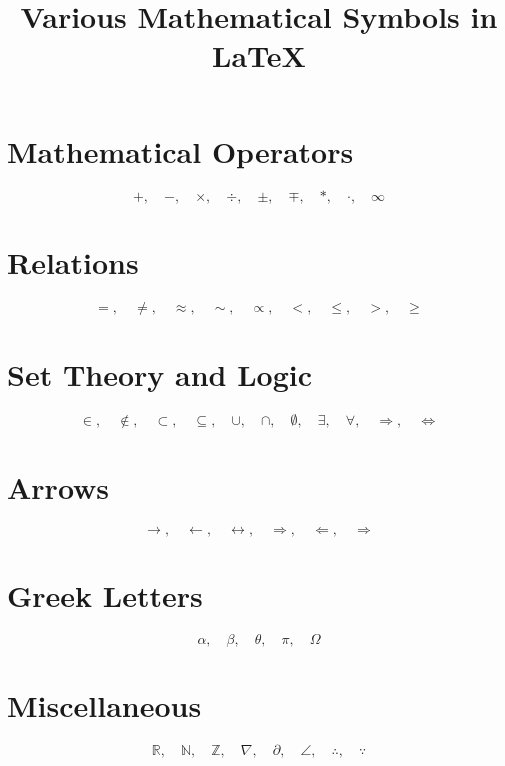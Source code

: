 \documentclass{article}
\title{Various Mathematical Symbols in LaTeX}
\begin{document}
\maketitle

\section*{Mathematical Operators}
\[
+, \quad -, \quad \times, \quad \div, \quad \pm, \quad \mp, \quad \ast, \quad \cdot, \quad \infty
\]

\section*{Relations}
\[
=, \quad \neq, \quad \approx, \quad \sim, \quad \propto, \quad <, \quad \leq, \quad >, \quad \geq
\]

\section*{Set Theory and Logic}
\[
\in, \quad \notin, \quad \subset, \quad \subseteq, \quad \cup, \quad \cap, \quad \emptyset, \quad \exists, \quad \forall, \quad \Rightarrow, \quad \Leftrightarrow
\]

\section*{Arrows}
\[
\rightarrow, \quad \leftarrow, \quad \leftrightarrow, \quad \Rightarrow, \quad \Leftarrow, \quad \Longrightarrow
\]

\section*{Greek Letters}
\[
\alpha, \quad \beta, \quad \theta, \quad \pi, \quad \Omega
\]

\section*{Miscellaneous}
\[
\mathbb{R}, \quad \mathbb{N}, \quad \mathbb{Z}, \quad \nabla, \quad \partial, \quad \angle, \quad \therefore, \quad \because
\]
\end{document}
